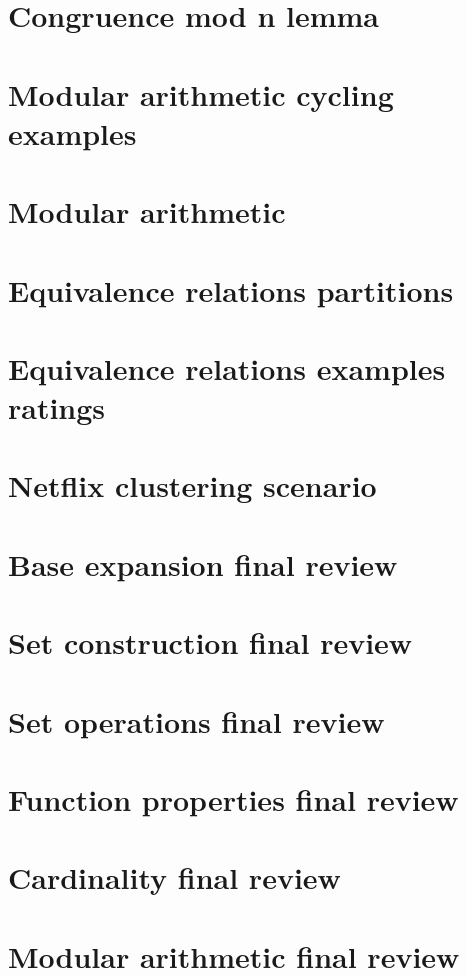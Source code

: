 \section*{Congruence mod n lemma}

\vfill
\section*{Modular arithmetic cycling examples}

\vfill
\section*{Modular arithmetic}

\vfill
\section*{Equivalence relations partitions}

\vfill
\section*{Equivalence relations examples ratings}

\vfill
\section*{Netflix clustering scenario}

\vfill
\section*{Base expansion final review}

\vfill
\section*{Set construction final review}

\vfill
\section*{Set operations final review}

\vfill
\section*{Function properties final review}

\vfill
\section*{Cardinality final review}

\vfill
\section*{Modular arithmetic final review}

\vfill
